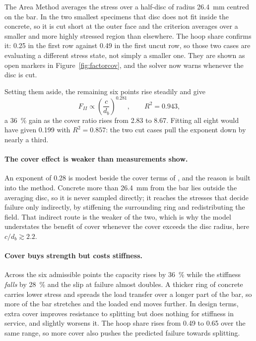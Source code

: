 The Area Method averages the stress over a half-disc of radius
\SI{26.4}{\milli\metre} centred on the bar. In the two smallest specimens
that disc does not fit inside the concrete, so it is cut short at the outer
face and the criterion averages over a smaller and more highly stressed
region than elsewhere. The hoop share confirms it: \num{0.25} in the first
row against \num{0.49} in the first uncut row, so those two cases are
evaluating a different stress state, not simply a smaller one. They are
shown as open markers in Figure~\ref{fig:factorcov}, and the solver now
warns whenever the disc is cut.

Setting them aside, the remaining six points rise steadily and give
\begin{equation}
\label{eq:coverfit}
F_{II} \propto \left(\frac{c}{d_b}\right)^{0.281},
\qquad R^2 = 0.943 ,
\end{equation}
a \SI{36}{\percent} gain as the cover ratio rises from \num{2.83} to
\num{8.67}. Fitting all eight would have given \num{0.199} with
$R^2 = 0.857$: the two cut cases pull the exponent down by nearly a third.

\paragraph{The cover effect is weaker than measurements show.}
An exponent of \num{0.28} is modest beside the cover terms of
\textcite{orangunStrengthAnchoredBars}, and the reason is built into the
method. Concrete more than \SI{26.4}{\milli\metre} from the bar lies outside the
averaging disc, so it is never sampled directly; it reaches the stresses
that decide failure only indirectly, by stiffening the surrounding ring
and redistributing the field. That indirect route is the weaker of the
two, which is why the model understates the benefit of cover whenever the
cover exceeds the disc radius, here $c/d_b \gtrsim 2.2$.

\paragraph{Cover buys strength but costs stiffness.}
Across the six admissible points the capacity rises by \SI{36}{\percent}
while the stiffness \emph{falls} by \SI{28}{\percent} and the slip at
failure almost doubles. A thicker ring of concrete carries lower stress and
spreads the load transfer over a longer part of the bar, so more of the bar
stretches and the loaded end moves further. In design terms, extra cover
improves resistance to splitting but does nothing for stiffness in
service, and slightly worsens it. The hoop share rises from \num{0.49} to
\num{0.65} over the same range, so more cover also pushes the predicted
failure towards splitting.

